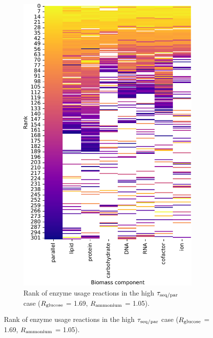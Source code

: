 \begin{figure}
\begin{subfigure}[t]{0.45\textwidth}
    \includegraphics[width=\linewidth]{CompareEnzUse_glc01p69_pyrUnres_amm01p05_1.pdf}
    \caption{
      Rank of enzyme usage reactions in the high $\tau_{\mathrm{seq}/\mathrm{par}}$ case ($R_{\mathrm{glucose}}$ = \SI{1.69}{\mmolgdwh}, $R_{\mathrm{ammonium}}$ = \SI{1.05}{\mmolgdwh}).
    }
    \label{fig:model-rank-glc-highratio-rank}
  \end{subfigure}


\end{figure}
